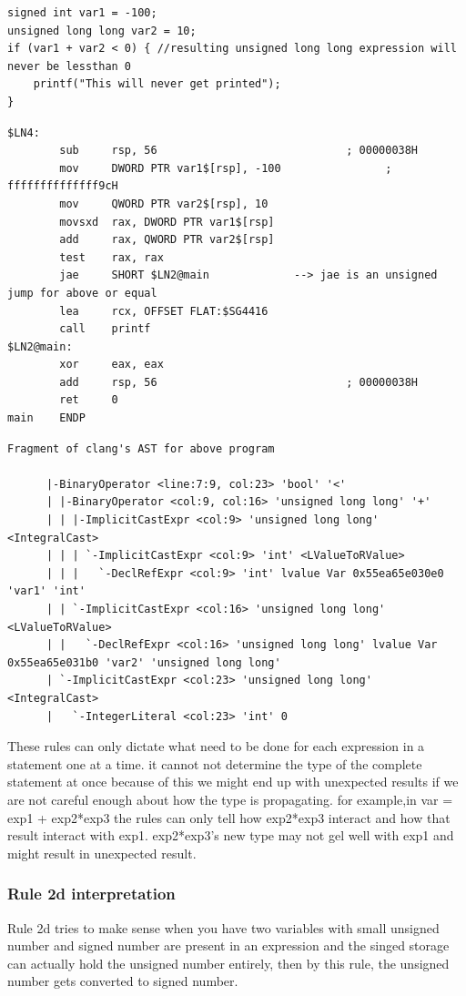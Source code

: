 \documentclass{article}
\begin{document}
\begin{verbatim}
signed int var1 = -100;
unsigned long long var2 = 10;
if (var1 + var2 < 0) { //resulting unsigned long long expression will never be lessthan 0
    printf("This will never get printed");
}
\end{verbatim}
\begin{verbatim}
$LN4:
        sub     rsp, 56                             ; 00000038H
        mov     DWORD PTR var1$[rsp], -100                ; ffffffffffffff9cH
        mov     QWORD PTR var2$[rsp], 10
        movsxd  rax, DWORD PTR var1$[rsp]
        add     rax, QWORD PTR var2$[rsp]
        test    rax, rax
        jae     SHORT $LN2@main             --> jae is an unsigned jump for above or equal
        lea     rcx, OFFSET FLAT:$SG4416
        call    printf
$LN2@main:
        xor     eax, eax
        add     rsp, 56                             ; 00000038H
        ret     0
main    ENDP
\end{verbatim}
\begin{verbatim}
Fragment of clang's AST for above program

      |-BinaryOperator <line:7:9, col:23> 'bool' '<'
      | |-BinaryOperator <col:9, col:16> 'unsigned long long' '+'
      | | |-ImplicitCastExpr <col:9> 'unsigned long long' <IntegralCast>
      | | | `-ImplicitCastExpr <col:9> 'int' <LValueToRValue>
      | | |   `-DeclRefExpr <col:9> 'int' lvalue Var 0x55ea65e030e0 'var1' 'int'
      | | `-ImplicitCastExpr <col:16> 'unsigned long long' <LValueToRValue>
      | |   `-DeclRefExpr <col:16> 'unsigned long long' lvalue Var 0x55ea65e031b0 'var2' 'unsigned long long'
      | `-ImplicitCastExpr <col:23> 'unsigned long long' <IntegralCast>
      |   `-IntegerLiteral <col:23> 'int' 0
\end{verbatim}


These rules can only dictate what need to be done for each expression in a
statement one at a time.  it cannot not determine the type of the complete
statement at once because of this we might end up with unexpected results if
we are not careful enough about how the type is propagating.
for example,in var = exp1 + exp2*exp3 the rules can only tell how exp2*exp3
interact and how that result interact with exp1. exp2*exp3's new type may not
gel well with exp1 and might result in unexpected result.

\subsubsection{Rule 2d interpretation}
Rule 2d tries to make sense when you have two variables with small
unsigned number and signed number are present in an expression and the
singed storage can actually hold the unsigned number entirely, then by this
rule, the unsigned number gets converted to signed number.
\end{document}
